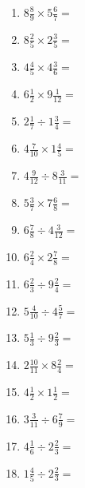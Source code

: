 \documentclass[12pt]{article}
\begin{document}
\begin{enumerate}
\item \large $ 8 \frac{8}{9} \times 5 \frac{6}{7} = $ \vspace{1.6cm}
\item \large $ 8 \frac{2}{5} \times 2 \frac{3}{5} = $ \vspace{1.6cm}
\item \large $ 4 \frac{4}{5} \times 4 \frac{3}{6} = $ \vspace{1.6cm}
\item \large $ 6 \frac{1}{2} \times 9 \frac{1}{12} = $ \vspace{1.6cm}
\newpage
\item \large $ 2 \frac{1}{7} \div 1 \frac{3}{4} = $ \vspace{1.6cm}
\item \large $ 4 \frac{7}{10} \times 1 \frac{4}{5} = $ \vspace{1.6cm}
\item \large $ 4 \frac{9}{12} \div 8 \frac{3}{11} = $ \vspace{1.6cm}
\item \large $ 5 \frac{3}{7} \times 7 \frac{6}{8} = $ \vspace{1.6cm}
\item \large $ 6 \frac{7}{8} \div 4 \frac{3}{12} = $ \vspace{1.6cm}
\item \large $ 6 \frac{2}{4} \times 2 \frac{7}{8} = $ \vspace{1.6cm}
\item \large $ 6 \frac{2}{3} \div 9 \frac{2}{4} = $ \vspace{1.6cm}
\item \large $ 5 \frac{4}{10} \div 4 \frac{5}{7} = $ \vspace{1.6cm}
\item \large $ 5 \frac{1}{3} \div 9 \frac{2}{3} = $ \vspace{1.6cm}
\item \large $ 2 \frac{10}{11} \times 8 \frac{2}{4} = $ \vspace{1.6cm}
\newpage
\item \large $ 4 \frac{1}{2} \times 1 \frac{1}{2} = $ \vspace{1.6cm}
\item \large $ 3 \frac{3}{11} \div 6 \frac{7}{9} = $ \vspace{1.6cm}
\item \large $ 4 \frac{1}{6} \div 2 \frac{2}{3} = $ \vspace{1.6cm}
\item \large $ 1 \frac{4}{5} \div 2 \frac{2}{3} = $ \vspace{1.6cm}

\end{enumerate}
\end{document}
